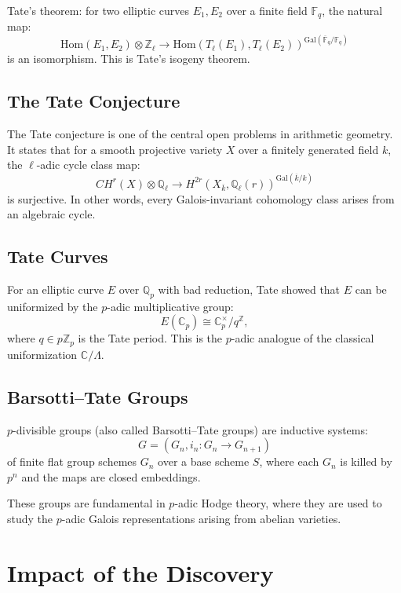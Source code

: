 Tate's theorem: for two elliptic curves $E_1, E_2$ over a finite field $\mathbb{F}_q$, the natural map:
\[
\mathrm{Hom}(E_1, E_2) \otimes \mathbb{Z}_\ell \to \mathrm{Hom}(T_\ell(E_1), T_\ell(E_2))^{\mathrm{Gal}(\overline{\mathbb{F}}_q/\mathbb{F}_q)}
\]
is an isomorphism. This is Tate's isogeny theorem.

\subsection{The Tate Conjecture}

The Tate conjecture is one of the central open problems in arithmetic geometry. It states that for a smooth projective variety $X$ over a finitely generated field $k$, the $\ell$-adic cycle class map:
\[
CH^r(X) \otimes \mathbb{Q}_\ell \to H^{2r}(X_{\overline{k}}, \mathbb{Q}_\ell(r))^{\mathrm{Gal}(\overline{k}/k)}
\]
is surjective. In other words, every Galois-invariant cohomology class arises from an algebraic cycle.

\subsection{Tate Curves}

For an elliptic curve $E$ over $\mathbb{Q}_p$ with bad reduction, Tate showed that $E$ can be uniformized by the $p$-adic multiplicative group:
\[
E(\mathbb{C}_p) \cong \mathbb{C}_p^\times / q^\mathbb{Z},
\]
where $q \in p\mathbb{Z}_p$ is the Tate period. This is the $p$-adic analogue of the classical uniformization $\mathbb{C}/\Lambda$.

\subsection{Barsotti--Tate Groups}

$p$-divisible groups (also called Barsotti--Tate groups) are inductive systems:
\[
G = (G_n, i_n: G_n \to G_{n+1})
\]
of finite flat group schemes $G_n$ over a base scheme $S$, where each $G_n$ is killed by $p^n$ and the maps are closed embeddings.

These groups are fundamental in $p$-adic Hodge theory, where they are used to study the $p$-adic Galois representations arising from abelian varieties.

\section{Impact of the Discovery}

